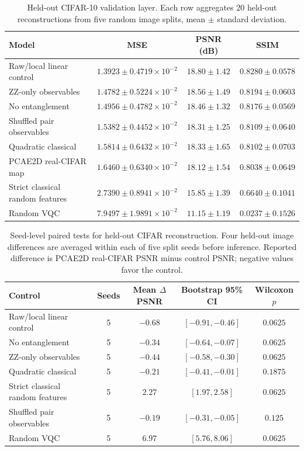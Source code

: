 \documentclass[11pt]{article}
\begin{document}
\begin{table}[H]
\centering
\caption{Held-out CIFAR-10 validation layer. Each row aggregates 20 held-out reconstructions from five random image splits, mean $\pm$ standard deviation.}
\label{tab:hvk_real_cifar}
\scriptsize
\begin{tabular}{lccc}
\toprule
Model & MSE & PSNR (dB) & SSIM \\
\midrule
Raw/local linear control & $1.3923{\pm}0.4719\times10^{-2}$ & $18.80{\pm}1.42$ & $0.8280{\pm}0.0578$ \\
ZZ-only observables & $1.4782{\pm}0.5224\times10^{-2}$ & $18.56{\pm}1.49$ & $0.8194{\pm}0.0603$ \\
No entanglement & $1.4956{\pm}0.4782\times10^{-2}$ & $18.46{\pm}1.32$ & $0.8176{\pm}0.0569$ \\
Shuffled pair observables & $1.5382{\pm}0.4452\times10^{-2}$ & $18.31{\pm}1.25$ & $0.8109{\pm}0.0640$ \\
Quadratic classical & $1.5814{\pm}0.6432\times10^{-2}$ & $18.33{\pm}1.65$ & $0.8102{\pm}0.0703$ \\
PCAE2D real-CIFAR map & $1.6460{\pm}0.6340\times10^{-2}$ & $18.12{\pm}1.54$ & $0.8038{\pm}0.0649$ \\
Strict classical random features & $2.7390{\pm}0.8941\times10^{-2}$ & $15.85{\pm}1.39$ & $0.6640{\pm}0.1041$ \\
Random VQC & $7.9497{\pm}1.9891\times10^{-2}$ & $11.15{\pm}1.19$ & $0.0237{\pm}0.1526$ \\
\bottomrule
\end{tabular}
\end{table}

\begin{table}[H]
\centering
\caption{Seed-level paired tests for held-out CIFAR reconstruction. Four held-out image differences are averaged within each of five split seeds before inference. Reported difference is PCAE2D real-CIFAR PSNR minus control PSNR; negative values favor the control.}
\label{tab:hvk_real_cifar_stats}
\scriptsize
\begin{tabular}{lcccc}
\toprule
Control & Seeds & Mean $\Delta$PSNR & Bootstrap 95\% CI & Wilcoxon $p$ \\
\midrule
Raw/local linear control & 5 & $-0.68$ & $[-0.91,-0.46]$ & $0.0625$ \\
No entanglement & 5 & $-0.34$ & $[-0.64,-0.07]$ & $0.0625$ \\
ZZ-only observables & 5 & $-0.44$ & $[-0.58,-0.30]$ & $0.0625$ \\
Quadratic classical & 5 & $-0.21$ & $[-0.41,-0.01]$ & $0.1875$ \\
Strict classical random features & 5 & $2.27$ & $[1.97,2.58]$ & $0.0625$ \\
Shuffled pair observables & 5 & $-0.19$ & $[-0.31,-0.05]$ & $0.125$ \\
Random VQC & 5 & $6.97$ & $[5.76,8.06]$ & $0.0625$ \\
\bottomrule
\end{tabular}
\end{table}
\end{document}
